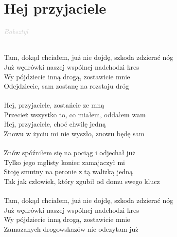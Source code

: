 \documentclass[a5paper, 10pt]{book}
\begin{document}
\section{Hej przyjaciele}\textcolor{lightgray}{\textit{Babsztyl}}\\~\\
\begin{minipage}[t]{0.75\textwidth}
  Tam, dokąd chciałem, już nie dojdę, szkoda zdzierać nóg\\
  Już wędrówki naszej wspólnej nadchodzi kres\\
  Wy pójdziecie inną drogą, zostawicie mnie\\
  Odejdziecie, sam zostanę na rozstaju dróg\\
  \\
  \hspace*{5mm}Hej, przyjaciele, zostańcie ze mną\\
  \hspace*{5mm}Przecież wszystko to, co miałem, oddałem wam\\
  \hspace*{5mm}Hej, przyjaciele, choć chwilę jedną\\
  \hspace*{5mm}Znowu w życiu mi nie wyszło, znowu będę sam\\
  \\
  Znów spóźniłem się na pociąg i odjechał już\\
  Tylko jego mglisty koniec zamajaczył mi\\
  Stoję smutny na peronie z tą walizką jedną\\
  Tak jak człowiek, który zgubił od domu swego klucz\\
  \\
  Tam, dokąd chciałem, już nie dojdę, szkoda zdzierać nóg\\
  Już wędrówki naszej wspólnej nadchodzi kres\\
  Wy pójdziecie inną drogą, zostawicie mnie\\
  Zamazanych drogowskazów nie odczytam już\\
\end{minipage}
\end{document}
